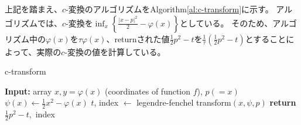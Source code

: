 上記を踏まえ、$c$-変換のアルゴリズムをAlgorithm\ref{al:c-transform}に示す。
アルゴリズムでは、$c$-変換を$\inf_x\left\{\frac{|x-p|^2}{2} - \varphi(x)\right\}$としている。
そのため、アルゴリズム中の$\varphi(x)$を$\tau\varphi(x)$、returnされた値$\frac{1}{2} p^2 - t$を$\frac{1}{\tau}\left(\frac{1}{2} p^2 - t\right)$とすることによって、実際の$c$-変換の値を計算している。

\begin{algorithm}[tb]
    \caption{c-transform}
    \label{al:c-transform}
    \begin{algorithmic}[1]
        \State \textbf{Input:} array $x,y = \varphi(x)$ (coordinates of function $f$), $p(=x)$
        \State $\psi(x) \gets \frac{1}{2} x^2 - \varphi(x)$
        \State $t$, index $\gets$ legendre-fenchel transform$(x, \psi, p)$
        \State \textbf{return} $\frac{1}{2} p^2 - t, $ index
    \end{algorithmic}
\end{algorithm}

